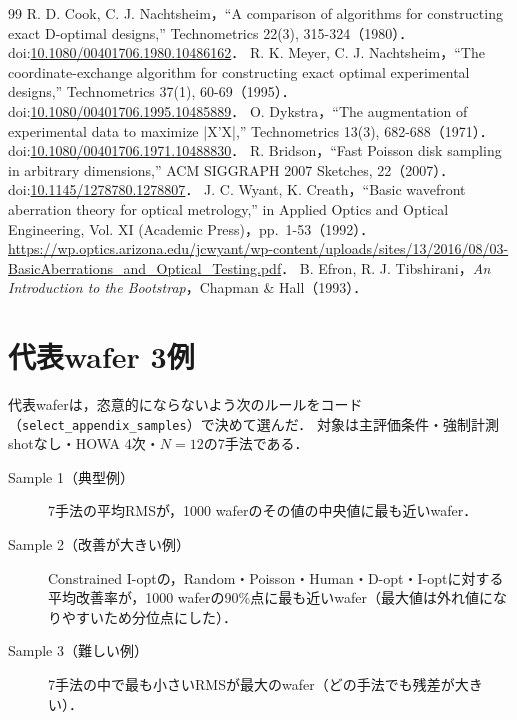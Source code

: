 \documentclass[10.5pt,a4paper]{ltjsarticle}
\begin{document}
\begin{thebibliography}{99}
 R. D. Cook, C. J. Nachtsheim，``A comparison of algorithms for constructing exact D-optimal designs,'' Technometrics 22(3), 315-324（1980）． doi:\href{https://doi.org/10.1080/00401706.1980.10486162}{10.1080/00401706.1980.10486162}．
 R. K. Meyer, C. J. Nachtsheim，``The coordinate-exchange algorithm for constructing exact optimal experimental designs,'' Technometrics 37(1), 60-69（1995）． doi:\href{https://doi.org/10.1080/00401706.1995.10485889}{10.1080/00401706.1995.10485889}．
 O. Dykstra，``The augmentation of experimental data to maximize |X'X|,'' Technometrics 13(3), 682-688（1971）． doi:\href{https://doi.org/10.1080/00401706.1971.10488830}{10.1080/00401706.1971.10488830}．
 R. Bridson，``Fast Poisson disk sampling in arbitrary dimensions,'' ACM SIGGRAPH 2007 Sketches, 22（2007）． doi:\href{https://doi.org/10.1145/1278780.1278807}{10.1145/1278780.1278807}．
 J. C. Wyant, K. Creath，``Basic wavefront aberration theory for optical metrology,'' in Applied Optics and Optical Engineering, Vol. XI (Academic Press)，pp.~1-53（1992）． \url{https://wp.optics.arizona.edu/jcwyant/wp-content/uploads/sites/13/2016/08/03-BasicAberrations_and_Optical_Testing.pdf}．
 B. Efron, R. J. Tibshirani，\textit{An Introduction to the Bootstrap}，Chapman \& Hall（1993）．
\end{thebibliography}


\clearpage
\appendix
\section{代表wafer 3例}
\label{sec:appendix}

代表waferは，恣意的にならないよう次のルールをコード（\texttt{select\_appendix\_samples}）で決めて選んだ．
対象は主評価条件・強制計測shotなし・HOWA 4次・$N=12$の7手法である．

\begin{description}
  \item[Sample 1（典型例）] 7手法の平均RMSが，1000 waferのその値の中央値に最も近いwafer．
  \item[Sample 2（改善が大きい例）] Constrained I-optの，Random・Poisson・Human・D-opt・I-optに対する平均改善率が，1000 waferの90\%点に最も近いwafer（最大値は外れ値になりやすいため分位点にした）．
  \item[Sample 3（難しい例）] 7手法の中で最も小さいRMSが最大のwafer（どの手法でも残差が大きい）．
\end{description}
\end{document}
